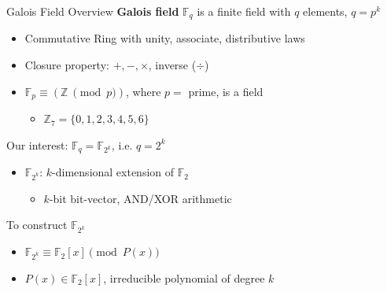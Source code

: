 \documentclass[xcolor=dvipsnames]{beamer}
\begin{document}
\begin{frame}{\large {Galois Field Overview}}
\textbf {Galois field} $\mathbb{F}_q$ is a finite field with $q$
elements, $q = p^k$
\begin{itemize}
\item Commutative Ring with unity, associate, distributive laws
\item Closure property: $+,-,\times$, inverse ($\div$)
\end{itemize}

\begin{itemize}
\item $\mathbb{F}_p \equiv (\mathbb{Z} ~\pmod{ p })$, where $p = $ prime, is a field
\begin{itemize}
\item $\mathbb{Z}_7=\{0,1,2,3,4,5,6\}$
\end{itemize}


\end{itemize}

Our interest: $\mathbb{F}_{q} = \mathbb{F}_{2^k}$, i.e. $q = 2^k$
\begin{itemize}
\item  $\mathbb{F}_{2^k}$: $k$-dimensional extension of  $\mathbb{F}_{2}$
	\begin{itemize}
	\item $k$-bit bit-vector, AND/XOR arithmetic
	\end{itemize}
\end{itemize}

To construct $\mathbb{F}_{2^k}$
\begin{itemize}
\item $\mathbb{F}_{2^k} \equiv \mathbb{F}_{2}[x] \pmod {P(x)}$
\item $P(x) \in \mathbb{F}_{2}[x]$, irreducible polynomial of degree $k$
\end{itemize}

\end{frame}
\end{document}
